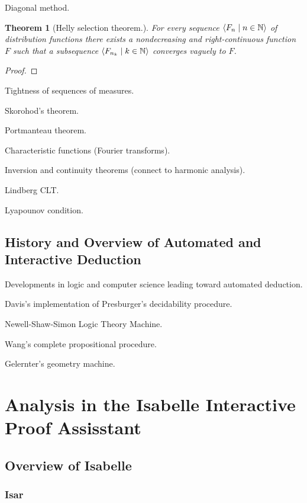 \documentclass{amsart}
\newtheorem{theorem}{Theorem}[section]
\theoremstyle{definition}
\theoremstyle{remark}
\newcommand{\bldseq}[2]{\langle{#1}\mid{#2}\rangle}
\begin{document}
Diagonal method.

\begin{theorem}[Helly selection theorem.]
For every sequence $\bldseq{F_n}{n \in \N}$ of distribution functions there exists a nondecreasing and right-continuous function $F$ such that a subsequence $\bldseq{F_{n_k}}{k \in \N}$ converges vaguely to $F$.
\end{theorem}

\begin{proof}
\end{proof}

Tightness of sequences of measures.

Skorohod's theorem.

Portmanteau theorem.

Characteristic functions (Fourier transforms).

Inversion and continuity theorems (connect to harmonic analysis).

Lindberg CLT.

Lyapounov condition.

\subsection{History and Overview of Automated and Interactive Deduction} \label{AutoDed}

Developments in logic and computer science leading toward automated deduction.

Davis's implementation of Presburger's decidability procedure.

Newell-Shaw-Simon Logic Theory Machine.

Wang's complete propositional procedure.

Gelernter's geometry machine.

\section{Analysis in the Isabelle Interactive Proof Assisstant} \label{Isa}

\subsection{Overview of Isabelle}

\subsubsection{Isar}
\end{document}
